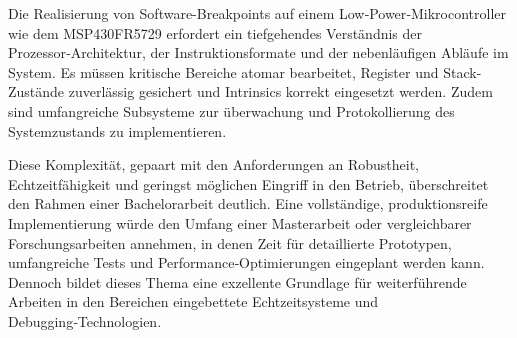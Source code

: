 Die Realisierung von Software-Breakpoints auf einem Low‑Power‑Mikrocontroller wie dem MSP430FR5729 erfordert ein tiefgehendes Verst\"andnis der Prozessor‑Architektur, der Instruktionsformate und der nebenl\"aufigen Abl\"aufe im System. Es m\"ussen kritische Bereiche atomar bearbeitet, Register und Stack-Zust\"ande zuverl\"assig gesichert und Intrinsics korrekt eingesetzt werden. Zudem sind umfangreiche Subsysteme zur \"uberwachung und Protokollierung des Systemzustands zu implementieren.

Diese Komplexit\"at, gepaart mit den Anforderungen an Robustheit, Echtzeitf\"ahigkeit und geringst m\"oglichen Eingriff in den Betrieb, \"uberschreitet den Rahmen einer Bachelorarbeit deutlich. Eine vollst\"andige, produktionsreife Implementierung w\"urde den Umfang einer Masterarbeit oder vergleichbarer Forschungsarbeiten annehmen, in denen Zeit f\"ur detaillierte Prototypen, umfangreiche Tests und Performance‑Optimierungen eingeplant werden kann. Dennoch bildet dieses Thema eine exzellente Grundlage f\"ur weiterf\"uhrende Arbeiten in den Bereichen eingebettete Echtzeitsysteme und Debugging‑Technologien.

